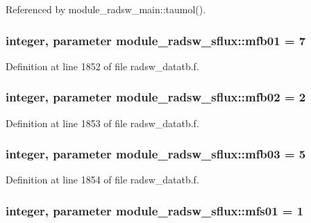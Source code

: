 Referenced by module\+\_\+radsw\+\_\+main\+::taumol().

\subsubsection[{\texorpdfstring{mfb01}{mfb01}}]{\setlength{\rightskip}{0pt plus 5cm}integer, parameter module\+\_\+radsw\+\_\+sflux\+::mfb01 = 7}\hypertarget{namespacemodule__radsw__sflux_a08a0f1278962ac27634169ea7632bc70}{}\label{namespacemodule__radsw__sflux_a08a0f1278962ac27634169ea7632bc70}


Definition at line 1852 of file radsw\+\_\+datatb.\+f.

\subsubsection[{\texorpdfstring{mfb02}{mfb02}}]{\setlength{\rightskip}{0pt plus 5cm}integer, parameter module\+\_\+radsw\+\_\+sflux\+::mfb02 = 2}\hypertarget{namespacemodule__radsw__sflux_afdf71cabed6ae0076d98ff0e563dbc61}{}\label{namespacemodule__radsw__sflux_afdf71cabed6ae0076d98ff0e563dbc61}


Definition at line 1853 of file radsw\+\_\+datatb.\+f.

\subsubsection[{\texorpdfstring{mfb03}{mfb03}}]{\setlength{\rightskip}{0pt plus 5cm}integer, parameter module\+\_\+radsw\+\_\+sflux\+::mfb03 = 5}\hypertarget{namespacemodule__radsw__sflux_a2e3b510d781c596fa0bb9b1359a988dd}{}\label{namespacemodule__radsw__sflux_a2e3b510d781c596fa0bb9b1359a988dd}


Definition at line 1854 of file radsw\+\_\+datatb.\+f.

\subsubsection[{\texorpdfstring{mfs01}{mfs01}}]{\setlength{\rightskip}{0pt plus 5cm}integer, parameter module\+\_\+radsw\+\_\+sflux\+::mfs01 = 1}\hypertarget{namespacemodule__radsw__sflux_aba08e6f9d4dccd130e87300e6fd0ed58}{}\label{namespacemodule__radsw__sflux_aba08e6f9d4dccd130e87300e6fd0ed58}


